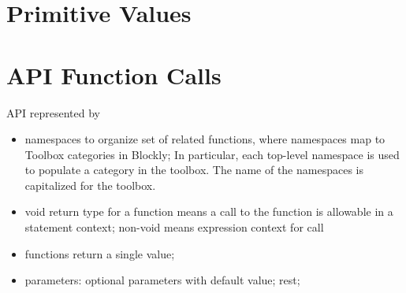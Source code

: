 \documentclass[sigplan,10pt]{acmart}
\begin{document}



\section{Primitive Values}



\section{API Function Calls}

API represented by
\begin{itemize}
  \item namespaces to organize set of related functions, 
       where namespaces map to Toolbox categories in Blockly;
       In particular, each top-level namespace is used to populate a category 
       in the toolbox. The name of the namespaces is capitalized for the toolbox. 

  \item void return type for a function means a call to the function is allowable in
      a statement context; non-void means expression context for call
  \item functions return a single value;
  \item parameters: optional parameters with default value; rest; 
\end{itemize}




\end{document}
